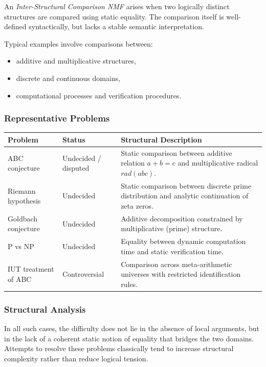 \documentclass[11pt]{article}
\begin{document}
An \emph{Inter-Structural Comparison NMF} arises when two logically
distinct structures are compared using static equality.
The comparison itself is well-defined syntactically, but lacks a
stable semantic interpretation.

Typical examples involve comparisons between:
\begin{itemize}
\item additive and multiplicative structures,
\item discrete and continuous domains,
\item computational processes and verification procedures.
\end{itemize}

\subsubsection{Representative Problems}

\begin{center}
\begin{tabular}{|l|l|p{7cm}|}
\hline
Problem & Status & Structural Description \\
\hline
ABC conjecture & Undecided / disputed &
Static comparison between additive relation $a+b=c$
and multiplicative radical $rad(abc)$. \\
\hline
Riemann hypothesis & Undecided &
Static comparison between discrete prime distribution
and analytic continuation of zeta zeros. \\
\hline
Goldbach conjecture & Undecided &
Additive decomposition constrained by multiplicative
(prime) structure. \\
\hline
P vs NP & Undecided &
Equality between dynamic computation time
and static verification time. \\
\hline
IUT treatment of ABC & Controversial &
Comparison across meta-arithmetic universes with
restricted identification rules. \\
\hline
\end{tabular}
\end{center}

\subsubsection{Structural Analysis}

In all such cases, the difficulty does not lie in the absence of local
arguments, but in the lack of a coherent static notion of equality
that bridges the two domains.
Attempts to resolve these problems classically tend to increase
structural complexity rather than reduce logical tension.
\end{document}
